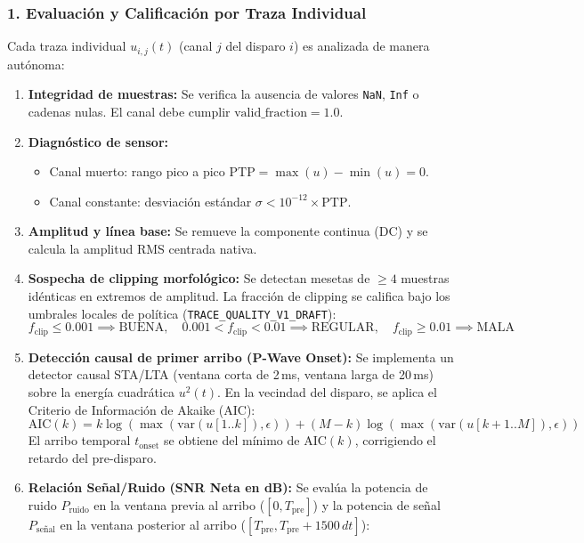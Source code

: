 \documentclass[11pt,a4paper]{article}
\begin{document}
\subsubsection{1. Evaluación y Calificación por Traza Individual}
Cada traza individual $u_{i,j}(t)$ (canal $j$ del disparo $i$) es analizada de manera autónoma:
\begin{enumerate}
    \item \textbf{Integridad de muestras:} Se verifica la ausencia de valores \texttt{NaN}, \texttt{Inf} o cadenas nulas. El canal debe cumplir $\text{valid\_fraction} = 1.0$.
    \item \textbf{Diagnóstico de sensor:} 
    \begin{itemize}
        \item Canal muerto: rango pico a pico $\text{PTP} = \max(u) - \min(u) = 0$.
        \item Canal constante: desviación estándar $\sigma < 10^{-12} \times \text{PTP}$.
    \end{itemize}
    \item \textbf{Amplitud y línea base:} Se remueve la componente continua (DC) y se calcula la amplitud RMS centrada nativa.
    \item \textbf{Sospecha de clipping morfológico:} Se detectan mesetas de $\ge 4$ muestras idénticas en extremos de amplitud. La fracción de clipping se califica bajo los umbrales locales de política (\texttt{TRACE\_QUALITY\_V1\_DRAFT}):
    \begin{equation}
        f_{\text{clip}} \le 0.001 \implies \text{BUENA}, \quad 0.001 < f_{\text{clip}} < 0.01 \implies \text{REGULAR}, \quad f_{\text{clip}} \ge 0.01 \implies \text{MALA}
    \end{equation}
    \item \textbf{Detección causal de primer arribo (P-Wave Onset):}
    Se implementa un detector causal STA/LTA (ventana corta de 2\,ms, ventana larga de 20\,ms) sobre la energía cuadrática $u^2(t)$. En la vecindad del disparo, se aplica el Criterio de Información de Akaike (AIC):
    \begin{equation}
        \text{AIC}(k) = k \log \left(\max(\text{var}(u[1..k]), \epsilon)\right) + (M-k) \log \left(\max(\text{var}(u[k+1..M]), \epsilon)\right)
    \end{equation}
    El arribo temporal $t_{\text{onset}}$ se obtiene del mínimo de $\text{AIC}(k)$, corrigiendo el retardo del pre-disparo.
    \item \textbf{Relación Señal/Ruido (SNR Neta en dB):}
    Se evalúa la potencia de ruido $P_{\text{ruido}}$ en la ventana previa al arribo ($[0, T_{\text{pre}}]$) y la potencia de señal $P_{\text{señal}}$ en la ventana posterior al arribo ($[T_{\text{pre}}, T_{\text{pre}} + 1500\,dt]$):

\end{enumerate}
\end{document}

